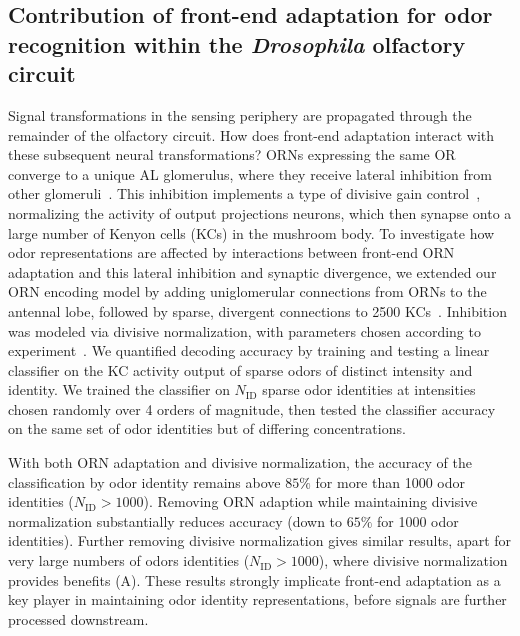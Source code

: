 \documentclass[9pt,lineno]{elife}
\begin{document}
\subsection{Contribution of front-end adaptation for odor recognition within the \textit{Drosophila} olfactory circuit}



Signal transformations in the sensing periphery are propagated through the remainder of the olfactory circuit. How does front-end adaptation interact with these subsequent neural transformations? ORNs expressing the same OR converge to a unique AL glomerulus, where they receive lateral inhibition from other glomeruli~\citep{lateral_inh, lateral_inh_asahina}. This inhibition implements a type of divisive gain control~\citep{divisive_normalization}, normalizing the activity of output projections neurons, which then synapse onto a large number of Kenyon cells (KCs) in the mushroom body. To investigate how odor representations are affected by interactions between front-end ORN adaptation and this lateral inhibition and synaptic divergence, we extended our ORN encoding model by adding uniglomerular connections from ORNs to the antennal lobe, followed by sparse, divergent connections to 2500 KCs~\citep{memory_review, litwinkumar, abbott_axel}. Inhibition was modeled via divisive normalization, with parameters chosen according to experiment~\citep{divisive_normalization}.
We quantified decoding accuracy by training and testing a linear classifier on the KC activity output of sparse odors of distinct intensity and identity. We trained the classifier on $N_{{\text {ID}}}$ sparse odor identities at intensities chosen randomly over 4 orders of magnitude, then tested the classifier accuracy on the same set of odor identities but of differing concentrations. 

With both ORN adaptation and divisive normalization, the accuracy of the classification by odor identity remains above $85\%$ for more than 1000 odor identities ($N_{{\text {ID}}}>1000$). Removing ORN adaption while maintaining divisive normalization substantially reduces accuracy (down to $65\%$ for 1000 odor identities). Further removing divisive normalization gives similar results, apart for very large numbers of odors identities ($N_{{\text {ID}}}>1000$), where divisive normalization provides benefits (A). These results strongly implicate front-end adaptation as a key player in maintaining odor identity representations, before signals are further processed downstream. 
\end{document}
